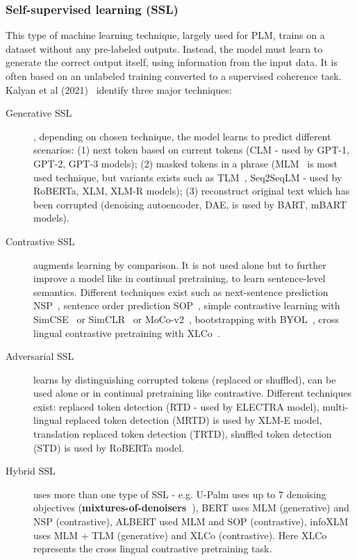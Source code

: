 \documentclass[acmsmall]{acmart}
\begin{document}
\subsubsection{Self-supervised learning (SSL)}
This type of machine learning technique, largely used for PLM, trains on a dataset without any pre-labeled outputs. Instead, the model must learn to generate the correct output itself, using information from the input data. It is often based on an unlabeled training converted to a supervised coherence task. Kalyan et al (2021)~\citep{kalyanAMMUSSurveyTransformerbased2021} identify three major techniques:
\begin{description}
    \item [Generative SSL], depending on chosen technique, the model learns to predict different scenarios: (1) next token based on current tokens (CLM - used by GPT-1, GPT-2, GPT-3 models); (2) masked tokens in a phrase (MLM~\citep{devlinBERTPretrainingDeep2019} is most used technique, but variants exists such as TLM~\citep{lampleCrosslingualLanguageModel2019}, Seq2SeqLM - used by RoBERTa, XLM, XLM-R models); (3) reconstruct original text which has been corrupted (denoising autoencoder, DAE, is used by BART, mBART models).
    \item [Contrastive SSL] augments learning by comparison. It is not used alone but to further improve a model like in continual pretraining, to learn sentence-level semantics. Different techniques exist such as next-sentence prediction NSP~\citep{devlinBERTPretrainingDeep2019}, sentence order prediction SOP~\citep{lanALBERTLiteBERT2020}, simple contrastive learning with SimCSE~\citep{gaoSimCSESimpleContrastive2022} or SimCLR~\citep{chenSimpleFrameworkContrastive2020} or MoCo-v2~\citep{chenImprovedBaselinesMomentum2020}, bootstrapping with BYOL~\citep{grillBootstrapYourOwn2020}, cross lingual contrastive pretraining with XLCo~\citep{chiInfoXLMInformationTheoreticFramework2021}.
    \item [Adversarial SSL] learns by distinguishing corrupted tokens (replaced or shuffled), can be used alone or in continual pretraining like contrastive. Different techniques exist: replaced token detection (RTD - used by ELECTRA model), multi-lingual replaced token detection (MRTD) is used by XLM-E model, translation replaced token detection (TRTD), shuffled token detection (STD) is used by RoBERTa model.
    \item [Hybrid SSL] uses more than one type of SSL - e.g. U-Palm uses up to 7 denoising objectives (\textbf{mixtures-of-denoisers~\citep{tayUL2UnifyingLanguage2022}}), BERT uses MLM (generative) and NSP (contrastive), ALBERT used MLM and SOP (contrastive), infoXLM uses MLM + TLM (generative) and XLCo (contrastive). Here XLCo represents the cross lingual contrastive pretraining task.
\end{description}
\end{document}
